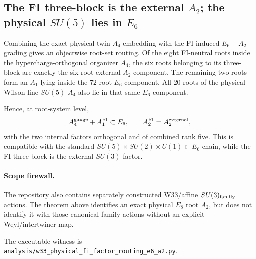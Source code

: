 \subsection*{The FI three-block is the external $A_2$; the physical $SU(5)$ lies in $E_6$}

Combining the exact physical twin-$A_4$ embedding with the FI-induced
$E_6+A_2$ grading gives an objectwise root-set routing.  Of the eight
FI-neutral roots inside the hypercharge-orthogonal organizer $A_4$, the six
roots belonging to its three-block are exactly the six-root external $A_2$
component.  The remaining two roots form an $A_1$ lying inside the $72$-root
$E_6$ component.  All $20$ roots of the physical Wilson-line $SU(5)$ $A_4$
also lie in that same $E_6$ component.

Hence, at root-system level,
\[
A_4^{\rm gauge}+A_1^{\rm FI}\subset E_6,
\qquad
A_2^{\rm FI}=A_2^{\rm external},
\]
with the two internal factors orthogonal and of combined rank five.  This is
compatible with the standard $SU(5)\times SU(2)\times U(1)\subset E_6$
chain, while the FI three-block is the external $SU(3)$ factor.

\paragraph{Scope firewall.}
The repository also contains separately constructed W33/affine
$SU(3)_{\rm family}$ actions.  The theorem above identifies an exact physical
$E_8$ root $A_2$, but does not identify it with those canonical family actions
without an explicit Weyl/intertwiner map.

The executable witness is
\texttt{analysis/w33\_physical\_fi\_factor\_routing\_e6\_a2.py}.
